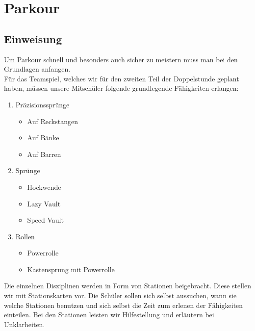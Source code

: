 \documentclass[ngerman,12pt,titlepage]{scrartcl}
\begin{document}
\newpage

\section{Parkour}
\subsection{Einweisung}
Um Parkour schnell und besonders auch sicher zu meistern muss man bei den Grundlagen anfangen. \\ Für das Teamspiel, welches wir für den zweiten Teil der Doppelstunde geplant haben, müssen unsere Mitschüler folgende grundlegende Fähigkeiten erlangen:

\begin{enumerate}
	\item Präzisionssprünge
	\begin{itemize}
		\item Auf Reckstangen
		\item Auf Bänke
		\item Auf Barren
	\end{itemize}
	\item Sprünge
	\begin{itemize}
		\item Hockwende
		\item Lazy Vault
		\item Speed Vault
	\end{itemize}
\item Rollen
\begin{itemize}
\item Powerrolle
\item Kastensprung mit Powerrolle
\end{itemize}
\end{enumerate}
Die einzelnen Disziplinen werden in Form von Stationen beigebracht. Diese stellen wir mit Stationskarten vor. Die Schüler sollen sich selbst aussuchen, wann sie welche Stationen benutzen und sich selbst die Zeit zum erlenen der Fähigkeiten einteilen. Bei den Stationen leisten wir Hilfestellung und erläutern bei Unklarheiten. \\
\end{document}
